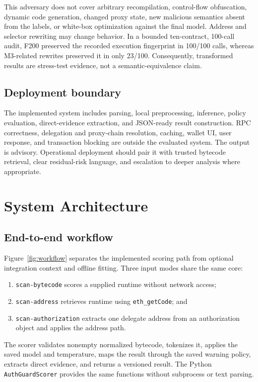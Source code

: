 \documentclass[conference]{IEEEtran}
\newcommand{\code}[1]{\texttt{#1}}
\begin{document}
This adversary does not cover arbitrary recompilation, control-flow obfuscation, dynamic code
generation, changed proxy state, new malicious semantics absent from the labels, or white-box
optimization against the final model. Address and selector rewriting may change behavior. In a
bounded ten-contract, 100-call audit, F200 preserved the recorded execution fingerprint in
100/100 calls, whereas M3-related rewrites preserved it in only 23/100. Consequently, transformed
results are stress-test evidence, not a semantic-equivalence claim.

\subsection{Deployment boundary}

The implemented system includes parsing, local preprocessing, inference, policy evaluation,
direct-evidence extraction, and JSON-ready result construction. RPC correctness, delegation and
proxy-chain resolution, caching, wallet UI, user response, and transaction blocking are outside
the evaluated system. The output is advisory. Operational deployment should pair it with trusted
bytecode retrieval, clear residual-risk language, and escalation to deeper analysis where
appropriate.

\section{System Architecture}
\label{sec:system}

\subsection{End-to-end workflow}

Figure~\ref{fig:workflow} separates the implemented scoring path from optional integration
context and offline fitting. Three input modes share the same core:
\begin{enumerate}
  \item \code{scan-bytecode} scores a supplied runtime without network access;
  \item \code{scan-address} retrieves runtime using \code{eth\_getCode}; and
  \item \code{scan-authorization} extracts one delegate address from an authorization object and
  applies the address path.
\end{enumerate}
The scorer validates nonempty normalized bytecode, tokenizes it, applies the saved model and
temperature, maps the result through the saved warning policy, extracts direct evidence, and
returns a versioned result. The Python \code{AuthGuardScorer} provides the same functions without
subprocess or text parsing.
\end{document}
